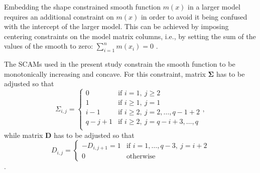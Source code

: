 Embedding the shape constrained smooth function \(m(x)\) in a larger model requires an additional constraint on \(m(x)\) in order to avoid it being confused with the intercept of the larger model.  This can be achieved by imposing centering constraints on the model matrix columns, i.e., by setting the sum of the values of the smooth to zero: \(\sum_{i = 1}^n m(x_i) = 0\) \parencite{Pya2015}.

The SCAMs used in the present study constrain the smooth function to be monotonically increasing and concave.  For this constraint, matrix \(\symbf{\Sigma}\) has to be adjusted so that
\begin{equation}
  \label{eq:SCAMSigmaMonotoneIncreasingConcave}
  \Sigma_{i, j} =
  \begin{cases}
    0 &\text{if } i = 1,~ j \geq 2 \\
    1 &\text{if } i \geq 1,~ j = 1 \\
    i - 1 &\text{if } i \geq 2,~ j = 2, \ldots, q - 1 + 2 \\
    q - j + 1 &\text{if } i \geq 2,~ j = q - i + 3, \ldots, q\\
  \end{cases},
\end{equation}
while matrix \(\symbf{D}\) has to be adjusted so that
\begin{equation}
  \label{eq:SCAMDMonotoneIncreasingConcave}
  D_{i, j} = 
  \begin{cases}
    - D_{i, j + 1} = 1 &\text{if } i = 1, \ldots, q - 3,~ j = i + 2 \\
    0 &\text{otherwise}
  \end{cases}
\end{equation}
\parencite{Pya2015}.

